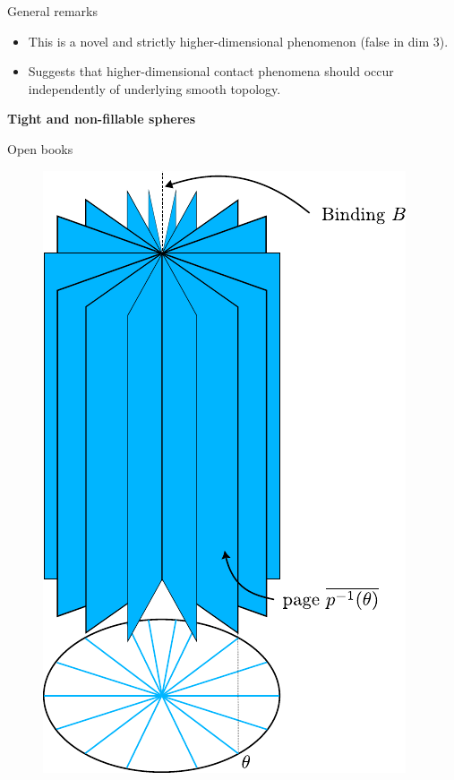 \documentclass{beamer}
\begin{document}
\begin{frame}{General remarks}

\begin{itemize}
    \item This is a novel and strictly higher-dimensional phenomenon (false in dim $3$).

\pause
    
    \item Suggests that higher-dimensional contact phenomena should occur independently of underlying smooth topology.
\end{itemize}

    
\end{frame}

\begin{frame}
\begin{tcolorbox}
\Huge \begin{center}
    \textbf{Tight and non-fillable spheres}
\end{center}
\end{tcolorbox}
\end{frame}

\begin{frame}{Open books}
    \begin{figure}
        \centering
        \includegraphics[width=.4\linewidth]{../images/open_book.pdf}
    \end{figure}
\end{frame}
\end{document}
